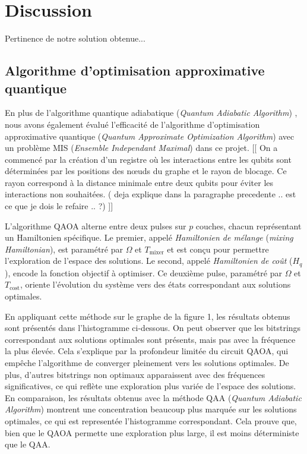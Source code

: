 \documentclass[11pt]{article}
\begin{document}
\section{Discussion}
Pertinence de notre solution obtenue...

\subsection{Algorithme d'optimisation approximative quantique}
En plus de l'algorithme quantique adiabatique (\textit{Quantum Adiabatic Algorithm}) , nous avons également évalué l'efficacité de l'algorithme d'optimisation approximative quantique (\textit{Quantum Approximate Optimization Algorithm}) avec un problème MIS (\textit{Ensemble Independant Maximal}) dans ce projet. 
[[ On a commencé par la création d'un registre où les interactions entre les qubits sont déterminées par les positions des nœuds du graphe et le rayon de blocage. Ce rayon correspond à la distance minimale entre deux qubits pour éviter les interactions non souhaitées. ( deja explique dans la paragraphe precedente .. est ce que je dois le refaire .. ?) ]] 
 
L'algorithme QAOA alterne entre deux pulses sur \( p \) couches, chacun représentant un Hamiltonien spécifique. Le premier, appelé \textit{Hamiltonien de mélange} (\textit{mixing Hamiltonian}), est paramétré par \( \Omega \) et \( T_{\text{mixer}} \) et est conçu pour permettre l'exploration de l'espace des solutions. Le second, appelé \textit{Hamiltonien de coût} (\( H_q \)), encode la fonction objectif à optimiser. Ce deuxième pulse, paramétré par \( \Omega \) et \( T_{\text{cost}} \), oriente l'évolution du système vers des états correspondant aux solutions optimales.

En appliquant cette méthode sur le graphe de la figure 1, les résultats obtenus sont présentés dans l'histogramme ci-dessous. On peut observer que les bitstrings correspondant aux solutions optimales sont présents, mais pas avec la fréquence la plus élevée. Cela s'explique par la profondeur limitée du circuit QAOA, qui empêche l'algorithme de converger pleinement vers les solutions optimales. De plus, d'autres bitstrings non optimaux apparaissent avec des fréquences significatives, ce qui reflète une exploration plus variée de l'espace des solutions.
En comparaison, les résultats obtenus avec la méthode QAA (\textit{Quantum Adiabatic Algorithm}) montrent une concentration beaucoup plus marquée sur les solutions optimales, ce qui est representée l'histogramme correspondant. Cela prouve que, bien que le QAOA permette une exploration plus large, il est moins déterministe que le QAA.
\end{document}
